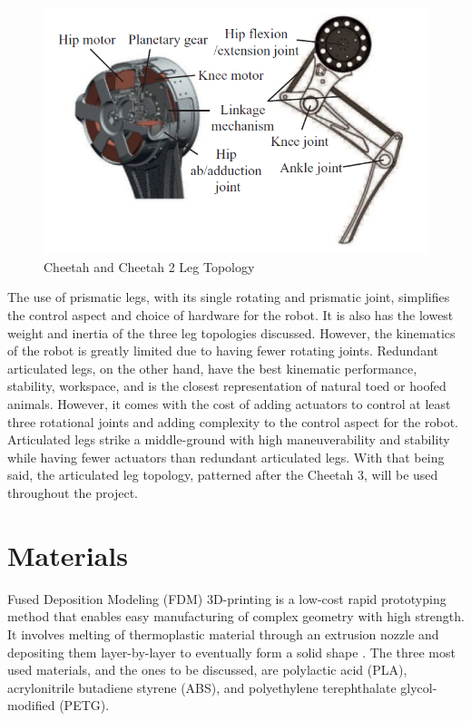 \documentclass[english]{upeeei}
\begin{document}
\begin{figure}[H]
\begin{centering}
\includegraphics[width=0.6\columnwidth]{images/cheetah12}
\par\end{centering}
\caption{Cheetah and Cheetah 2 Leg Topology\label{fig:cheetah12-leg}}
\end{figure}

The use of prismatic legs, with its single rotating and prismatic joint, simplifies the control aspect and choice of hardware for the robot. It is also has the lowest weight and inertia of the three leg topologies discussed. However, the kinematics of the robot is greatly limited due to having fewer rotating joints. Redundant articulated legs, on the other hand, have the best kinematic performance, stability, workspace, and is the closest representation of natural toed or hoofed animals. However, it comes with the cost of adding actuators to control at least three rotational joints and adding complexity to the control aspect for the robot. Articulated legs strike a middle-ground with high maneuverability and stability while having fewer actuators than redundant articulated legs. With that being said, the articulated leg topology, patterned after the Cheetah 3, will be used throughout the project.

\section{Materials}

Fused Deposition Modeling (FDM) 3D-printing is a low-cost rapid prototyping method that enables easy manufacturing of complex geometry with high strength. It involves melting of thermoplastic material through an extrusion nozzle and depositing them layer-by-layer to eventually form a solid shape \cite{pla-composites}. The three most used materials, and the ones to be discussed, are polylactic acid (PLA), acrylonitrile butadiene styrene (ABS), and polyethylene terephthalate glycol-modified (PETG). 
\end{document}

